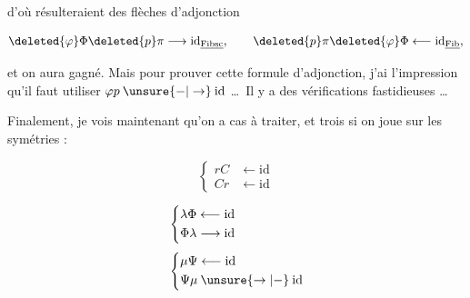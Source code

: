 d'où résulteraient des flèches d'adjonction

\[
 \deleted{\varphi}\Phi\deleted{p}\pi\longrightarrow\mathrm{id}_{\underline{\mathrm{Fibsc}}},
 \qquad \deleted{p}\pi\deleted{\varphi}\Phi\longleftarrow\mathrm{id}_{\underline{\mathrm{Fib}}},
\]

et on aura gagné. Mais pour prouver cette formule d'adjonction, j'ai l'impression qu'il faut  utiliser $\varphi p\mathbin{\unsure{-|\to}}\mathrm{id}$ \ldots\ Il y a des vérifications fastidieuses \ldots

Finalement, je vois maintenant qu'on a   cas à traiter, et trois si on joue sur les symétries :


\noindent\begin{minipage}{.62\linewidth}\small
{}
\end{minipage}\hfill\begin{minipage}{.36\linewidth}\small
\[
 \left\{\begin{aligned}rC&\longleftarrow\mathrm{id}\\ Cr&\longleftarrow\mathrm{id}\end{aligned}\right.
\]
\end{minipage}\par

\noindent\begin{minipage}{.62\linewidth}\small
{}
\end{minipage}\hfill\begin{minipage}{.36\linewidth}\small
\[
 \begin{aligned}
 &\left\{\begin{aligned}\lambda\Phi&\longleftarrow\mathrm{id}\\\Phi\lambda&\longrightarrow\mathrm{id}\end{aligned}\right.\\[3pt]
 &\left\{\begin{aligned}\mu\Psi&\longleftarrow\mathrm{id}\\\Psi\mu&\mathbin{\unsure{\to|-}}\mathrm{id}\end{aligned}\right.
 \end{aligned}
\]
\end{minipage}\par

